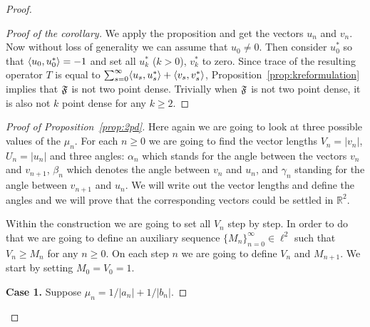 \begin{proof}
\begin{proof}[Proof of the corollary]
        We apply the proposition and get the vectors $u_n$ and $v_n$.
        Now without loss of generality we can assume that $u_0 \neq 0$.
        Then consider $u^*_0$ so that $\langle u_0, u^*_0 \rangle = -1$ and set all $u^*_k$ ($k > 0$), $v^*_k$ to zero.
        Since trace of the resulting operator $T$ is equal to $\sum_{s=0}^\infty \langle u_s, u^*_s \rangle + \langle v_s, v^*_s \rangle$,
          Proposition~\ref{prop:kreformulation} implies that $\mathfrak{F}$ is not two point dense.
        Trivially when $\mathfrak{F}$ is not two point dense, it is also not $k$ point dense for any $k \geq 2$.
      \end{proof}
      \begin{proof}[Proof of Proposition~\ref{prop:2pd}]
        Here again we are going to look at three possible values of the $\mu_n$.
        For each $n \geq 0$ we are going to find the vector lengths $V_n = |v_n|$, $U_n = |u_n|$ and three angles:
          $\alpha_n$ which stands for the angle between the vectors $v_n$ and $v_{n + 1}$,
          $\beta_n$ which denotes the angle between $v_n$ and $u_n$,
          and $\gamma_n$ standing for the angle between $v_{n + 1}$ and $u_n$.
        We will write out the vector lengths and define the angles and we will prove that the corresponding vectors could be settled in $\mathbb{R}^2$.

        Within the construction we are going to set all $V_n$ step by step.
        In order to do that we are going to define an auxiliary sequence $\{M_n\}_{n=0}^\infty \in \ell^2$ such that $V_n \geq M_n$ for any $n \geq 0$.
        On each step $n$ we are going to define $V_n$ and $M_{n+1}$.
        We start by setting $M_0 = V_0 = 1$.

        \noindent\textbf{Case 1.} Suppose $\mu_n = 1/|a_n| + 1/|b_n|$.


\end{proof}
\end{proof}
